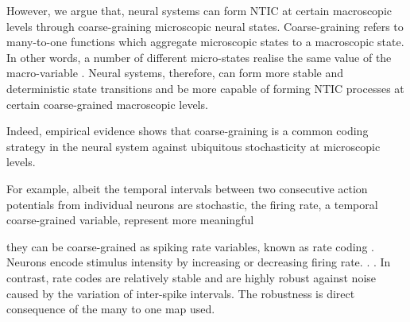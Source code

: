 \documentclass[utf8]{article}
\begin{document}

		However, we argue that, neural systems can form NTIC at certain macroscopic levels through coarse-graining microscopic neural states. Coarse-graining refers to many-to-one functions which aggregate microscopic states to a macroscopic state. In other words, a number of different micro-states realise the same value of the macro-variable \citep{price2007causation}. Neural systems, therefore, can form more stable and deterministic state transitions and be more capable of forming NTIC processes at certain coarse-grained macroscopic levels. 
		
		Indeed, empirical evidence shows that coarse-graining is a common coding strategy in the neural system against ubiquitous stochasticity at microscopic levels.
		
		
		For example, albeit the temporal intervals between two consecutive action potentials from individual neurons are stochastic, the firing rate, a temporal coarse-grained variable, represent more meaningful 
		
		they can be coarse-grained as spiking rate variables, known as rate coding \citep{adrian1926impulses, gerstner2002spiking, maass2001pulsed, panzeri2015neural, stein2005neuronal}. Neurons encode stimulus intensity by increasing or decreasing firing rate. \citep{kandel2000principles}.  \citep{stein2005neuronal}. In contrast, rate codes are relatively stable and are highly robust against noise caused by the variation of inter-spike intervals. The robustness is direct consequence of the many to one map used.
\end{document}
